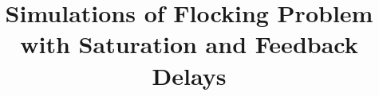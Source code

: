 \documentclass[10pt, conference]{IEEEtran}
\begin{document}
%
\title{Simulations of Flocking Problem with Saturation and Feedback Delays}

\def\titleName{{\title}}
\def\authorName{{Taylor Johnson}}


\author{
}


% 






\maketitle
\end{document}
